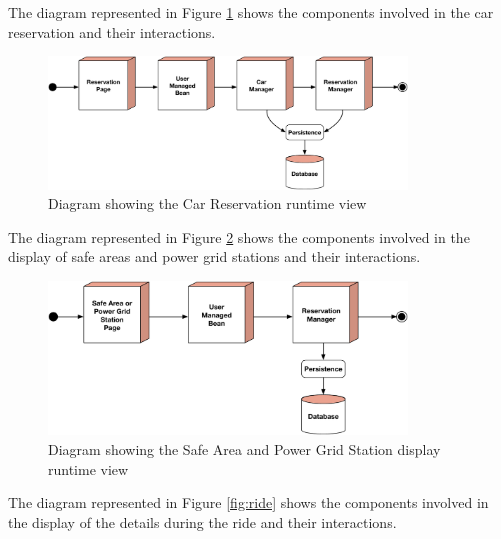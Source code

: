 \newline
The diagram represented in Figure \ref{fig:reserve} shows the components involved in the car reservation and their interactions.

\begin{figure}[htbp]
\centering
\vspace{104pt}
\includegraphics[width=0.85\textwidth]{Images/ReserveRun.pdf}
\vspace{10pt}
\caption{Diagram showing the Car Reservation runtime view}
\label{fig:reserve}
\end{figure}
\clearpage

\newline
The diagram represented in Figure \ref{fig:display} shows the components involved in the display of safe areas and power grid stations and their interactions.

\begin{figure}[htbp]
\centering
\vspace{104pt}
\includegraphics[width=0.85\textwidth]{Images/DisplayRun.pdf}
\vspace{10pt}
\caption{Diagram showing the Safe Area and Power Grid Station display runtime view}
\label{fig:display}
\end{figure}
\clearpage

\newline
The diagram represented in Figure \ref{fig:ride} shows the components involved in the display of the details during the ride and their interactions.

